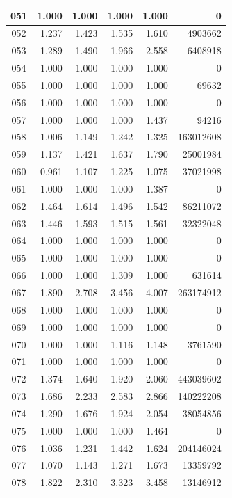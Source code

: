 \begin{longtable}{|c|r|r|r|r|r|}
\hline
051 & 1.000 & 1.000 & 1.000 & 1.000 & 0 \\
\hline
052 & 1.237 & 1.423 & 1.535 & 1.610 & 4903662 \\
\hline
053 & 1.289 & 1.490 & 1.966 & 2.558 & 6408918 \\
\hline
054 & 1.000 & 1.000 & 1.000 & 1.000 & 0 \\
\hline
055 & 1.000 & 1.000 & 1.000 & 1.000 & 69632 \\
\hline
056 & 1.000 & 1.000 & 1.000 & 1.000 & 0 \\
\hline
057 & 1.000 & 1.000 & 1.000 & 1.437 & 94216 \\
\hline
058 & 1.006 & 1.149 & 1.242 & 1.325 & 163012608 \\
\hline
059 & 1.137 & 1.421 & 1.637 & 1.790 & 25001984 \\
\hline
060 & 0.961 & 1.107 & 1.225 & 1.075 & 37021998 \\
\hline
061 & 1.000 & 1.000 & 1.000 & 1.387 & 0 \\
\hline
062 & 1.464 & 1.614 & 1.496 & 1.542 & 86211072 \\
\hline
063 & 1.446 & 1.593 & 1.515 & 1.561 & 32322048 \\
\hline
064 & 1.000 & 1.000 & 1.000 & 1.000 & 0 \\
\hline
065 & 1.000 & 1.000 & 1.000 & 1.000 & 0 \\
\hline
066 & 1.000 & 1.000 & 1.309 & 1.000 & 631614 \\
\hline
067 & 1.890 & 2.708 & 3.456 & 4.007 & 263174912 \\
\hline
068 & 1.000 & 1.000 & 1.000 & 1.000 & 0 \\
\hline
069 & 1.000 & 1.000 & 1.000 & 1.000 & 0 \\
\hline
070 & 1.000 & 1.000 & 1.116 & 1.148 & 3761590 \\
\hline
071 & 1.000 & 1.000 & 1.000 & 1.000 & 0 \\
\hline
072 & 1.374 & 1.640 & 1.920 & 2.060 & 443039602 \\
\hline
073 & 1.686 & 2.233 & 2.583 & 2.866 & 140222208 \\
\hline
074 & 1.290 & 1.676 & 1.924 & 2.054 & 38054856 \\
\hline
075 & 1.000 & 1.000 & 1.000 & 1.464 & 0 \\
\hline
076 & 1.036 & 1.231 & 1.442 & 1.624 & 204146024 \\
\hline
077 & 1.070 & 1.143 & 1.271 & 1.673 & 13359792 \\
\hline
078 & 1.822 & 2.310 & 3.323 & 3.458 & 13146912 \\

\end{longtable}
